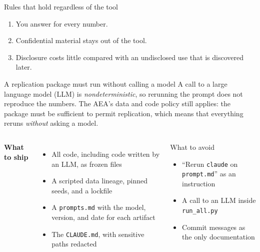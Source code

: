\documentclass[aspectratio=169,10pt]{beamer}
\newcommand{\emphc}[1]{\textcolor{harvardcrimson}{#1}}
\begin{document}
\begin{frame}{Rules that hold regardless of the tool}
\begin{enumerate}\itemsep16pt
  \item You answer for every number.
  \item Confidential material stays out of the tool.
  \item Disclosure costs little compared with an undisclosed use that is discovered later.
\end{enumerate}
\end{frame}

\begin{frame}{A replication package must run without calling a model}
A call to a large language model (LLM) is \emph{nondeterministic}, so rerunning the prompt does not reproduce the numbers. The AEA's data and code policy still applies: the package must be sufficient to permit replication, which means that everything reruns \emph{without} asking a model.

\vspace{0.8em}
\begin{columns}[T]
\textbf{What to ship}
\begin{itemize}\itemsep5pt
  \item All code, including code written by an LLM, as \emphc{frozen} files
  \item A scripted data lineage, pinned seeds, and a lockfile
  \item A \texttt{prompts.md} with the model, version, and date for each artifact
  \item The \texttt{CLAUDE.md}, with sensitive paths redacted
\end{itemize}
\begin{alertblock}{What to avoid}
\begin{itemize}\itemsep4pt
  \item ``Rerun \texttt{claude} on \texttt{prompt.md}'' as an instruction
  \item A call to an LLM inside \texttt{run\_all.py}
  \item Commit messages as the only documentation
\end{itemize}
\end{alertblock}
\end{columns}
\end{frame}
\end{document}
